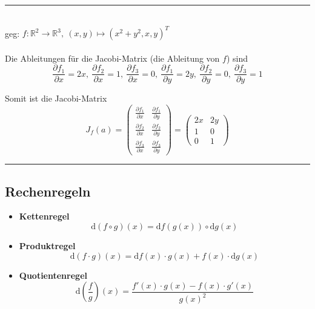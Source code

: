 \documentclass{article}
\newcommand{\diff}{\mathrm{d}}
\newcommand{\lr}[1]{\left(#1\right)}
\begin{document}
{\color{blue}
\hrule
	\\
	geg: $f:\mathbb{R}^2\to \mathbb{R}^3,\ (x,y)\mapsto (x^2+y^2, x, y)^T$\\
	\\
	Die Ableitungen für die Jacobi-Matrix (die Ableitung von $f$) sind
		$$\frac{\partial f_1}{\partial x} = 2x,\
			\frac{\partial f_2}{\partial x} = 1,\
			\frac{\partial f_3}{\partial x} = 0,\
			\frac{\partial f_1}{\partial y} = 2y,\
			\frac{\partial f_2}{\partial y} = 0,\
			\frac{\partial f_3}{\partial y} = 1$$
	
	Somit ist die Jacobi-Matrix
		$$J_f(a) =
		\begin{pmatrix}
			\frac{\partial f_1}{\partial x} & \frac{\partial f_1}{\partial y} \\[0.5em]
			\frac{\partial f_2}{\partial x} & \frac{\partial f_2}{\partial y} \\[0.5em]
			\frac{\partial f_3}{\partial x} & \frac{\partial f_3}{\partial y}
		\end{pmatrix}
		=
		\begin{pmatrix}
			2x & 2y \\
			1 & 0 \\
			0 & 1
		\end{pmatrix}
		$$
\hrule
}


\subsection{Rechenregeln}
	\begin{itemize}
		\item \textbf{Kettenregel}
			\begin{equation}
				\diff(f\circ g)(x) = \diff f(g(x)) \circ \diff g(x)
			\end{equation}

		\item \textbf{Produktregel}
			\begin{equation}
				\diff(f\cdot g)(x) = \diff f(x)\cdot g(x) + f(x)\cdot \diff g(x)
			\end{equation}
		
		\item \textbf{Quotientenregel}
			\begin{equation}
				\diff\lr{ \frac{f}{g} }(x) = \frac{f'(x)\cdot g(x) - f(x)\cdot g'(x)}{g(x)^2}
			\end{equation}
	\end{itemize}

\vspace{0.5cm}
\end{document}
